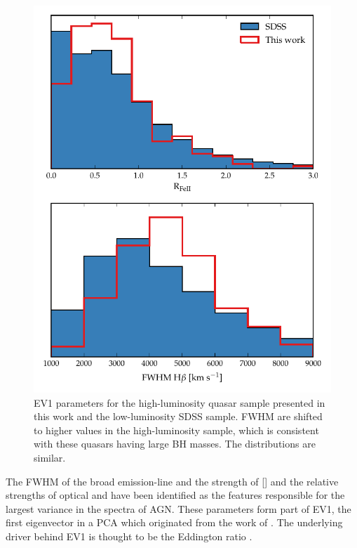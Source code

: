 \begin{figure}[t!]
    \includegraphics[width=\columnwidth]{figures/chapter04/ev1_hists.pdf} 
    \caption[{}]{EV1 parameters for the high-luminosity quasar sample presented in this work and the low-luminosity SDSS sample. \hb FWHM are shifted to higher values in the high-luminosity sample, which is consistent with these quasars having large BH masses. The  distributions are similar.}      
    \label{fig:ev1_hists}
\end{figure}


The FWHM of the broad \hb emission-line and the strength of [] and the relative strengths of optical  and \hb have been identified as the features responsible for the largest variance in the spectra of AGN.
These parameters form part of EV1, the first eigenvector in a PCA which originated from the work of \citet{boroson92}.   
The underlying driver behind EV1 is thought to be the Eddington ratio \citep[e.g.][]{sulentic00b,shen14}.

